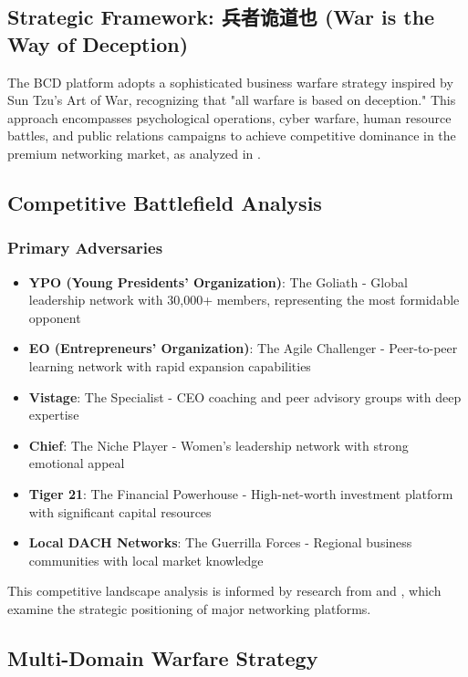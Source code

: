 \subsection{Strategic Framework: 兵者诡道也 (War is the Way of Deception)}

The BCD platform adopts a sophisticated business warfare strategy inspired by Sun Tzu's Art of War, recognizing that "all warfare is based on deception." This approach encompasses psychological operations, cyber warfare, human resource battles, and public relations campaigns to achieve competitive dominance in the premium networking market, as analyzed in \citep{abratt_competitive_analysis_and}.

\subsection{Competitive Battlefield Analysis}

\subsubsection{Primary Adversaries}
\begin{itemize}
    \item \textbf{YPO (Young Presidents' Organization)}: The Goliath - Global leadership network with 30,000+ members, representing the most formidable opponent
    \item \textbf{EO (Entrepreneurs' Organization)}: The Agile Challenger - Peer-to-peer learning network with rapid expansion capabilities
    \item \textbf{Vistage}: The Specialist - CEO coaching and peer advisory groups with deep expertise
    \item \textbf{Chief}: The Niche Player - Women's leadership network with strong emotional appeal
    \item \textbf{Tiger 21}: The Financial Powerhouse - High-net-worth investment platform with significant capital resources
    \item \textbf{Local DACH Networks}: The Guerrilla Forces - Regional business communities with local market knowledge
\end{itemize}

This competitive landscape analysis is informed by research from \citep{unknown_competitive_positioning_differentiation} and \citep{burgers_new_thoughts_on}, which examine the strategic positioning of major networking platforms.

\subsection{Multi-Domain Warfare Strategy}

